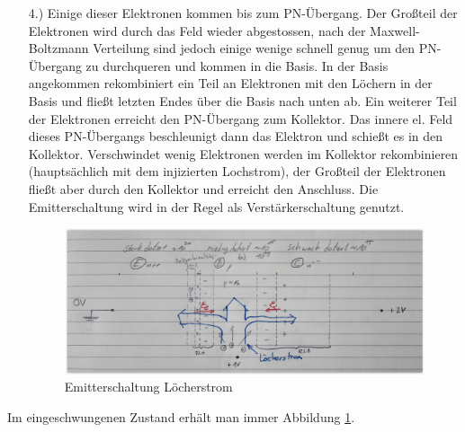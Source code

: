 \documentclass[12pt,a4paper]{report}%
\numberwithin{equation}{section}
\numberwithin{equation}{subsection}
\begin{document}
\begin{itemize}
			\item [4.) ] Einige dieser Elektronen kommen bis zum PN-Übergang. Der Großteil der Elektronen wird durch das Feld wieder abgestossen, nach der Maxwell-Boltzmann Verteilung sind jedoch einige wenige schnell genug um den PN-Übergang zu durchqueren und kommen in die Basis. In der Basis angekommen rekombiniert ein Teil an Elektronen mit den Löchern in der Basis und fließt letzten Endes über die Basis nach unten ab. Ein weiterer Teil der Elektronen erreicht den PN-Übergang zum Kollektor. Das innere el. Feld dieses PN-Übergangs beschleunigt dann das Elektron und schießt es in den Kollektor. Verschwindet wenig Elektronen werden im Kollektor rekombinieren (hauptsächlich mit dem injizierten Lochstrom), der Großteil der Elektronen fließt aber durch den Kollektor und erreicht den Anschluss. Die Emitterschaltung wird in der Regel als Verstärkerschaltung genutzt.
			\begin{figure}[H]
			  \centering
			  \captionsetup{justification=centering}
			  \includegraphics[width=1\linewidth]{bpt_emittersch.png}
			  \caption{Emitterschaltung Löcherstrom}
			  \label{fig:bpt_emittersch_lochstrom}
			\end{figure}
    \end{itemize}
  Im eingeschwungenen Zustand erhält man immer Abbildung \ref{fig:bpt_emittersch_lochstrom}. 
\end{document}
